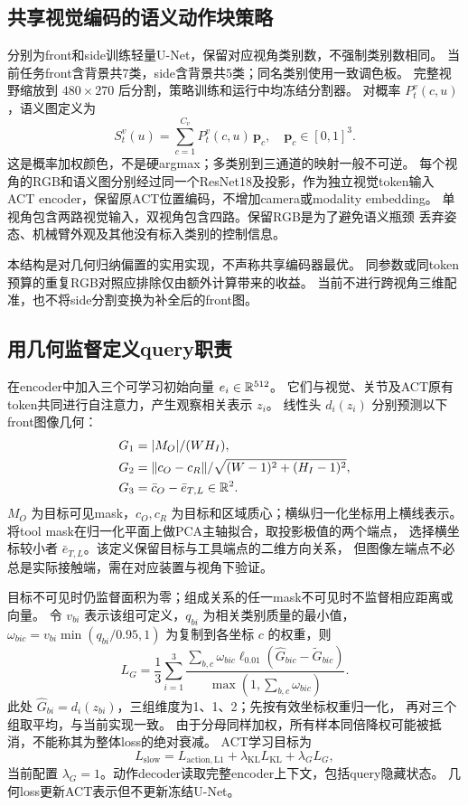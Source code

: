 \subsection{共享视觉编码的语义动作块策略}
分别为front和side训练轻量U-Net，保留对应视角类别数，不强制类别数相同。
当前任务front含背景共7类，side含背景共5类；同名类别使用一致调色板。
完整视野缩放到 $480\times270$ 后分割，策略训练和运行中均冻结分割器。
对概率 $P_t^v(c,u)$，语义图定义为
\begin{equation}
 S_t^v(u)=\sum_{c=1}^{C_v}P_t^v(c,u)\,\bm p_c,
 \quad \bm p_c\in[0,1]^3.
 \label{eq:palette}
\end{equation}
这是概率加权颜色，不是硬argmax；多类别到三通道的映射一般不可逆。
每个视角的RGB和语义图分别经过同一个ResNet18及投影，作为独立视觉token输入
ACT encoder，保留原ACT位置编码，不增加camera或modality embedding。
单视角包含两路视觉输入，双视角包含四路。保留RGB是为了避免语义瓶颈
丢弃姿态、机械臂外观及其他没有标入类别的控制信息。

本结构是对几何归纳偏置的实用实现，不声称共享编码器最优。
同参数或同token预算的重复RGB对照应排除仅由额外计算带来的收益。
当前不进行跨视角三维配准，也不将side分割变换为补全后的front图。

\subsection{用几何监督定义query职责}
在encoder中加入三个可学习初始向量 $e_i\in\mathbb R^{512}$。
它们与视觉、关节及ACT原有token共同进行自注意力，产生观察相关表示 $z_i$。
线性头 $d_i(z_i)$ 分别预测以下front图像几何：
\begin{align}
 G_1&=|M_O|/(W H_I),\nonumber\\
 G_2&=\lVert c_O-c_R\rVert/\sqrt{(W-1)^2+(H_I-1)^2},\nonumber\\
 G_3&=\bar c_O-\bar e_{T,L}\in\mathbb R^2.
 \label{eq:targets}
\end{align}
$M_O$ 为目标可见mask，$c_O,c_R$ 为目标和区域质心；横纵归一化坐标用上横线表示。
将tool mask在归一化平面上做PCA主轴拟合，取投影极值的两个端点，
选择横坐标较小者 $\bar e_{T,L}$。该定义保留目标与工具端点的二维方向关系，
但图像左端点不必总是实际接触端，需在对应装置与视角下验证。

目标不可见时仍监督面积为零；组成关系的任一mask不可见时不监督相应距离或向量。
令 $v_{bi}$ 表示该组可定义，$q_{bi}$ 为相关类别质量的最小值，
$\omega_{bic}=v_{bi}\min(q_{bi}/0.95,1)$ 为复制到各坐标 $c$ 的权重，则
\begin{equation}
 L_G=\frac13\sum_{i=1}^3
 \frac{\sum_{b,c}\omega_{bic}\ell_{0.01}(\widehat G_{bic}-\widetilde G_{bic})}
 {\max(1,\sum_{b,c}\omega_{bic})}.
 \label{eq:qloss}
\end{equation}
此处 $\widehat G_{bi}=d_i(z_{bi})$，三组维度为1、1、2；先按有效坐标权重归一化，
再对三个组取平均，与当前实现一致。
由于分母同样加权，所有样本同倍降权可能被抵消，不能称其为整体loss的绝对衰减。
ACT学习目标为
\begin{equation}
 L_{\mathrm{slow}}=L_{\mathrm{action,L1}}
       +\lambda_{\mathrm{KL}}L_{\mathrm{KL}}+\lambda_G L_G,
\end{equation}
当前配置 $\lambda_G=1$。动作decoder读取完整encoder上下文，包括query隐藏状态。
几何loss更新ACT表示但不更新冻结U-Net。

